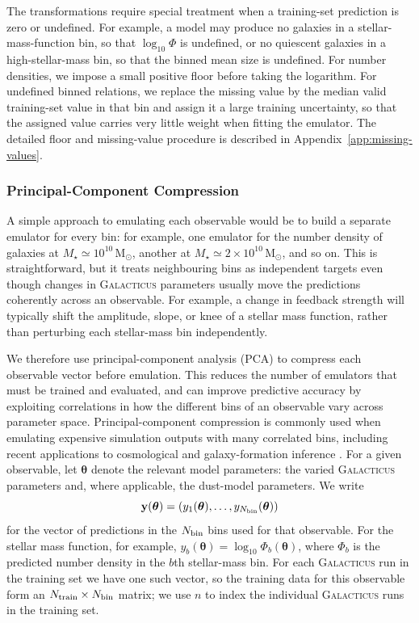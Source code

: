 \documentclass[twocolumn, apj, numberedappendix, iop]{openjournal}
\newcommand{\galacticus}{\textsc{Galacticus}\xspace}
\def\msun{\mathrm{\, M_\odot}}
\begin{document}
The transformations require special treatment when a training-set prediction
is zero or undefined. For example, a model may produce no galaxies in a
stellar-mass-function bin, so that $\log_{10}\Phi$ is undefined, or no
quiescent galaxies in a high-stellar-mass bin, so that the binned mean size is
undefined. For number densities, we impose a small positive floor before taking the logarithm. For undefined binned relations, we replace the missing value by the median valid training-set value in that bin and assign it a large training uncertainty, so that the assigned value carries very little weight when fitting the emulator. The detailed floor and missing-value procedure is described in Appendix~\ref{app:missing-values}.



\subsubsection{Principal-Component Compression}
\label{sec:pca-compression}

A simple approach to emulating each observable would be to build a separate emulator for every bin: for example, one emulator for the number density of galaxies at $M_\star\simeq10^{10}\msun$, another at $M_\star\simeq2\times10^{10}\msun$, and so on.
This is straightforward, but it treats neighbouring bins as independent targets even though changes in \galacticus{} parameters usually move the predictions coherently across an observable.
For example, a change in feedback strength will typically shift the amplitude, slope, or knee of a stellar mass function, rather than perturbing each stellar-mass bin independently.

We therefore use principal-component analysis (PCA) to compress each observable vector before emulation.
This reduces the number of emulators that must be trained and evaluated, and can improve predictive accuracy by exploiting correlations in how the different bins of an observable vary across parameter space.
Principal-component compression is commonly used when emulating expensive simulation outputs with many correlated bins, including recent applications to cosmological and galaxy-formation inference \citep[e.g.][]{2026arXiv260107306R}.
For a given observable, let $\boldsymbol{\theta}$ denote the relevant model parameters: the varied \galacticus{} parameters and, where applicable, the dust-model parameters. We write
\begin{equation}
  \mathbf{y}(\boldsymbol{\theta})
  =
  \left(y_1(\boldsymbol{\theta}), \ldots, y_{N_{\rm bin}}(\boldsymbol{\theta})\right)
\end{equation}
for the vector of predictions in the $N_{\rm bin}$ bins used for that observable.
For the stellar mass function, for example, $y_b(\boldsymbol{\theta})=\log_{10}\Phi_b(\boldsymbol{\theta})$, where $\Phi_b$ is the predicted number density in the $b$th stellar-mass bin.
For each \galacticus{} run in the training set we have one such vector, so the training data for this observable form an $N_{\rm train}\times N_{\rm bin}$ matrix; we use $n$ to index the individual \galacticus{} runs in the training set.
\end{document}

